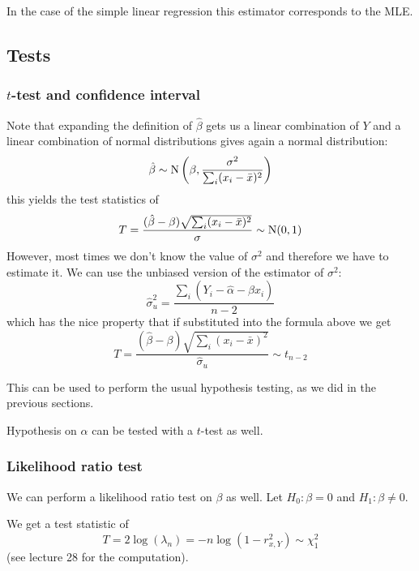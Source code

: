 \documentclass[12pt]{extarticle}
\newcommand{\Normal}{{\operatorfont N}}
\begin{document}
In the case of the simple linear regression this estimator corresponds to the MLE.

\subsection{Tests}

\subsubsection{\texorpdfstring{$t$}{t}-test and confidence interval}

Note that expanding the definition of $\hat \beta$ gets us a linear combination of $Y$
and a linear combination of normal distributions gives again a normal distribution:
\begin{equation}
    \hat \beta \sim \Normal\left(\beta, \frac{\sigma^2}{\sum_i (x_i - \bar x)^2}\right)
\end{equation}
this yields the test statistics of
\begin{equation}
    T = \frac{(\hat \beta - \beta)\sqrt{\sum_i (x_i - \bar x)^2}}{\sigma} \sim \Normal(0, 1)
\end{equation}
However, most times we don't know the value of $\sigma^2$ and therefore we have to estimate it.
We can use the unbiased version of the estimator of $\sigma^2$:
\begin{equation}
    \hat \sigma^2_u = \frac{\sum_i (Y_i - \hat \alpha - \hat \beta x_i)}{n-2}
    \label{eq:unbiased-est-var-slr}
\end{equation}
which has the nice property that if substituted into the formula above we get
\begin{equation}
    T = \frac{(\hat \beta - \beta)\sqrt{\sum_i (x_i - \bar x)^2}}{\hat \sigma_u} \sim t_{n -2}
\end{equation}

This can be used to perform the usual hypothesis testing, as we did in the previous sections.

Hypothesis on $\alpha$ can be tested with a $t$-test as well.

\subsubsection{Likelihood ratio test}
We can perform a likelihood ratio test on $\beta$ as well.
Let $H_0: \beta = 0$ and $H_1: \beta \neq 0$.

We get a test statistic of
\begin{equation}
    T = 2 \log(\lambda_n) = -n \log(1-r^2_{x, Y}) \sim \chi^2_1
\end{equation}
(see lecture 28 for the computation).
\end{document}
